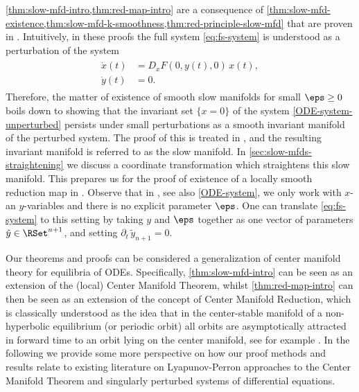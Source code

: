 \documentclass[a4paper]{siamart190516}
\begin{document}
\cref{thm:slow-mfd-intro,thm:red-map-intro}  
are a consequence
of \cref{thm:slow-mfd-existence,thm:slow-mfd-k-smoothness,thm:red-principle-slow-mfd}
that are proven in
. Intuitively, in these
proofs the full system \cref{eq:fs-system} is understood as a perturbation of the system
  \begin{align}
 \begin{split}\label{ODE-system-unperturbed}
 \dot{x}(t) &= D_x F(0,y(t),0) \, x(t) , \\
 \dot{y}(t) &= 0.
  \end{split}
 \end{align}
Therefore, the matter of existence of smooth slow manifolds for small $\eps \geq 0$
boils down to showing that the invariant set $\{ x = 0 \}$ of the system
\cref{ODE-system-unperturbed} persists under small perturbations as a smooth
invariant manifold of the perturbed system. The proof of this is treated in 
, 
and the resulting invariant manifold is referred to as
the slow manifold. In \cref{sec:slow-mfds-straightening} we discuss a
coordinate transformation which straightens this slow manifold. This prepares us for
the proof of existence of a locally smooth reduction map in .
Observe that in , see also \cref{ODE-system}, we only work with $x$-
an $y$-variables and there is no explicit parameter $\eps$. One can translate \cref{eq:fs-system}
to this setting by taking $y$ and $\eps$ together as one vector of parameters $\tilde{y} \in \RSet^{n+1}$, and setting $\partial_t \, \tilde{y}_{n+1} = 0$.

Our theorems and proofs can be considered a generalization of center manifold theory
for equilibria of ODEs. Specifically, \cref{thm:slow-mfd-intro} can be seen as
an extension of the (local) Center Manifold Theorem, whilst \cref{thm:red-map-intro} can
then be seen as an extension of the concept of Center Manifold Reduction, which is
classically understood as the idea that in the center-stable manifold of a
non-hyperbolic equilibrium (or periodic orbit) all orbits are asymptotically
attracted in forward time to an orbit lying on the center manifold, see for example
\cite{Ke67b}. In the following we provide some more perspective on how our proof methods and 
results relate to existing literature on Lyapunov-Perron approaches to the Center Manifold Theorem and
singularly perturbed systems of differential equations.
\end{document}

